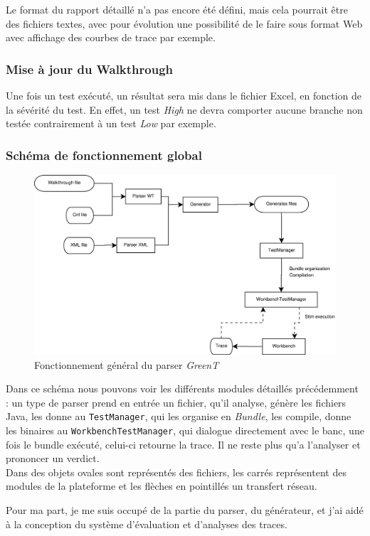 	Le format du rapport détaillé n'a pas encore été défini, mais cela pourrait être des fichiers textes, avec pour évolution une possibilité de le faire sous format Web avec affichage des courbes de trace par exemple.

	\subsubsection{Mise à jour du Walkthrough}
	Une fois un test exécuté, un résultat sera mis dans le fichier Excel, en fonction de la sévérité du test. En effet, un test \textit{High} ne devra comporter aucune branche non testée contrairement à un test \textit{Low} par exemple.
	
	\subsubsection{Schéma de fonctionnement global}
		\begin{figure}[H]
			\centering
			\includegraphics[width=15.5cm]{contents/images/generalDiag.eps}
			\caption{Fonctionnement général du parser \textit{GreenT}}
			\label{fig:generalDig}
		\end{figure}
		Dans ce schéma nous pouvons voir les différents modules détaillés précédemment : un type de parser prend en entrée un fichier, qu'il analyse, génère les fichiers Java, les donne au \texttt{TestManager}, qui les organise en \textit{Bundle}, les compile, donne les binaires au \texttt{WorkbenchTestManager}, qui dialogue directement avec le banc, une fois le bundle exécuté, celui-ci retourne la trace. Il ne reste plus qu'a l'analyser et prononcer un verdict.\\
		Dans des objets ovales sont représentés des fichiers, les carrés représentent des modules de la plateforme et les flèches en pointillés un transfert réseau.

	Pour ma part, je me suis occupé de la partie du parser, du générateur, et j'ai aidé à la conception du système d'évaluation et d'analyses des traces.
